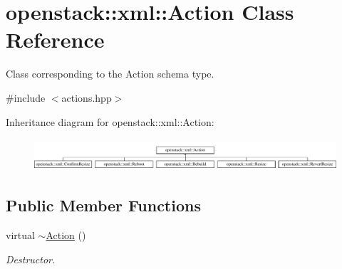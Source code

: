 \hypertarget{classopenstack_1_1xml_1_1Action}{
\section{openstack::xml::Action Class Reference}
\label{classopenstack_1_1xml_1_1Action}
}


Class corresponding to the Action schema type.  




{\ttfamily \#include $<$actions.hpp$>$}

Inheritance diagram for openstack::xml::Action:\begin{figure}[H]
\begin{center}
\leavevmode
\includegraphics[height=1.191489cm]{classopenstack_1_1xml_1_1Action}
\end{center}
\end{figure}
\subsection*{Public Member Functions}
\begin{DoxyCompactItemize}
\item 
\hypertarget{classopenstack_1_1xml_1_1Action_a6c73470aac4e8c8e6b3e3cbf886d015c}{
virtual \hyperlink{classopenstack_1_1xml_1_1Action_a6c73470aac4e8c8e6b3e3cbf886d015c}{$\sim$Action} ()}
\label{classopenstack_1_1xml_1_1Action_a6c73470aac4e8c8e6b3e3cbf886d015c}

\begin{DoxyCompactList}\small\item\em Destructor. \item\end{DoxyCompactList}\end{DoxyCompactItemize}
